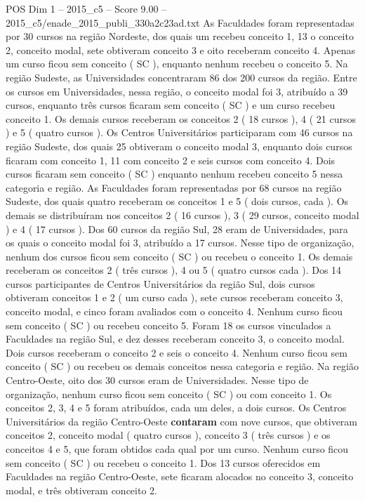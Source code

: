 \begin{textsample}{POS Dim 1 – 2015\_c5 – Score 9.00 – 2015\_c5/enade\_2015\_publi\_330a2c23ad.txt}
As Faculdades foram representadas por 30 cursos na região Nordeste, dos quais um recebeu conceito 1, 13 o conceito 2, conceito modal, sete obtiveram conceito 3 e oito receberam conceito 4.
Apenas um curso ficou sem conceito ( SC ), enquanto nenhum recebeu o conceito 5.
Na região Sudeste, as Universidades concentraram 86 dos 200 cursos da região.
Entre os cursos em Universidades, nessa região, o conceito modal foi 3, atribuído a 39 cursos, enquanto três cursos ficaram sem conceito ( SC ) e um curso recebeu conceito 1.
Os demais cursos receberam os conceitos 2 ( 18 cursos ), 4 ( 21 cursos ) e 5 ( quatro cursos ).
Os Centros Universitários participaram com 46 cursos na região Sudeste, dos quais 25 obtiveram o conceito modal 3, enquanto dois cursos ficaram com conceito 1, 11 com conceito 2 e seis cursos com conceito 4.
Dois cursos ficaram sem conceito ( SC ) enquanto nenhum recebeu conceito 5 nessa categoria e região.
As Faculdades foram representadas por 68 cursos na região Sudeste, dos quais quatro receberam os conceitos 1 e 5 ( dois cursos, cada ).
Os demais se distribuíram nos conceitos 2 ( 16 cursos ), 3 ( 29 cursos, conceito modal ) e 4 ( 17 cursos ).
Dos 60 cursos da região Sul, 28 eram de Universidades, para os quais o conceito modal foi 3, atribuído a 17 cursos.
Nesse tipo de organização, nenhum dos cursos ficou sem conceito ( SC ) ou recebeu o conceito 1.
Os demais receberam os conceitos 2 ( três cursos ), 4 ou 5 ( quatro cursos cada ).
Dos 14 cursos participantes de Centros Universitários da região Sul, dois cursos obtiveram conceitos 1 e 2 ( um curso cada ), sete cursos receberam conceito 3, conceito modal, e cinco foram avaliados com o conceito 4.
Nenhum curso ficou sem conceito ( SC ) ou recebeu conceito 5.
Foram 18 os cursos vinculados a Faculdades na região Sul, e dez desses receberam conceito 3, o conceito modal.
Dois cursos receberam o conceito 2 e seis o conceito 4.
Nenhum curso ficou sem conceito ( SC ) ou recebeu os demais conceitos nessa categoria e região.
Na região Centro-Oeste, oito dos 30 cursos eram de Universidades.
Nesse tipo de organização, nenhum curso ficou sem conceito ( SC ) ou com conceito 1.
Os conceitos 2, 3, 4 e 5 foram atribuídos, cada um deles, a dois cursos.
Os Centros Universitários da região Centro-Oeste \textbf{contaram} com nove cursos, que obtiveram conceitos 2, conceito modal ( quatro cursos ), conceito 3 ( três cursos ) e os conceitos 4 e 5, que foram obtidos cada qual por um curso.
Nenhum curso ficou sem conceito ( SC ) ou recebeu o conceito 1.
Dos 13 cursos oferecidos em Faculdades na região Centro-Oeste, sete ficaram alocados no conceito 3, conceito modal, e três obtiveram conceito 2.

\end{textsample}
